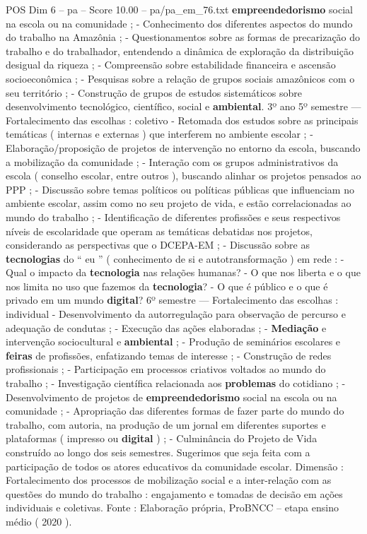 \begin{textsample}{POS Dim 6 – pa – Score 10.00 – pa/pa\_em\_76.txt}
\textbf{empreendedorismo} social na escola ou na comunidade ; - Conhecimento dos diferentes aspectos do mundo do trabalho na Amazônia ; - Questionamentos sobre as formas de precarização do trabalho e do trabalhador, entendendo a dinâmica de exploração da distribuição desigual da riqueza ; - Compreensão sobre estabilidade financeira e ascensão socioeconômica ; - Pesquisas sobre a relação de grupos sociais amazônicos com o seu território ; - Construção de grupos de estudos sistemáticos sobre desenvolvimento tecnológico, científico, social e \textbf{ambiental}. 3º ano 5º semestre — Fortalecimento das escolhas : coletivo - Retomada dos estudos sobre as principais temáticas ( internas e externas ) que interferem no ambiente escolar ; - Elaboração/proposição de projetos de intervenção no entorno da escola, buscando a mobilização da comunidade ; - Interação com os grupos administrativos da escola ( conselho escolar, entre outros ), buscando alinhar os projetos pensados ao PPP ; - Discussão sobre temas políticos ou políticas públicas que influenciam no ambiente escolar, assim como no seu projeto de vida, e estão correlacionadas ao mundo do trabalho ; - Identificação de diferentes profissões e seus respectivos níveis de escolaridade que operam as temáticas debatidas nos projetos, considerando as perspectivas que o DCEPA-EM ; - Discussão sobre as \textbf{tecnologias} do “ eu ” ( conhecimento de si e autotransformação ) em rede : - Qual o impacto da \textbf{tecnologia} nas relações humanas? - O que nos liberta e o que nos limita no uso que fazemos da \textbf{tecnologia}? - O que é público e o que é privado em um mundo \textbf{digital}? 6º semestre — Fortalecimento das escolhas : individual - Desenvolvimento da autorregulação para observação de percurso e adequação de condutas ; - Execução das ações elaboradas ; - \textbf{Mediação} e intervenção sociocultural e \textbf{ambiental} ; - Produção de seminários escolares e \textbf{feiras} de profissões, enfatizando temas de interesse ; - Construção de redes profissionais ; - Participação em processos criativos voltados ao mundo do trabalho ; - Investigação científica relacionada aos \textbf{problemas} do cotidiano ; - Desenvolvimento de projetos de \textbf{empreendedorismo} social na escola ou na comunidade ; - Apropriação das diferentes formas de fazer parte do mundo do trabalho, com autoria, na produção de um jornal em diferentes suportes e plataformas ( impresso ou \textbf{digital} ) ; - Culminância do Projeto de Vida construído ao longo dos seis semestres.
Sugerimos que seja feita com a participação de todos os atores educativos da comunidade escolar.
Dimensão : Fortalecimento dos processos de mobilização social e a inter-relação com as questões do mundo do trabalho : engajamento e tomadas de decisão em ações individuais e coletivas.
Fonte : Elaboração própria, ProBNCC – etapa ensino médio ( 2020 ).

\end{textsample}
